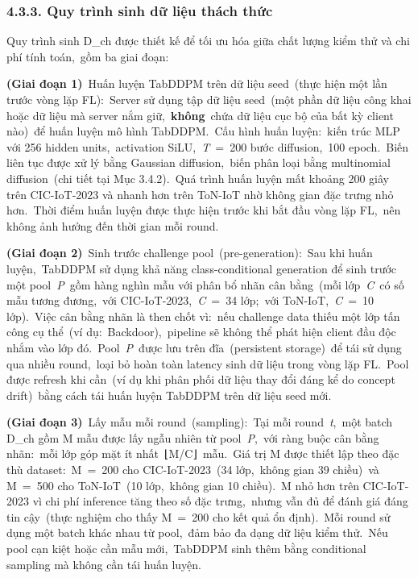 \subsubsection{4.3.3. Quy trình sinh dữ liệu thách thức}\label{quy-truxecnh-sinh-dux1eef-liux1ec7u-thuxe1ch-thux1ee9c}

Quy trình sinh D\_ch được thiết kế để tối ưu hóa giữa chất lượng kiểm thử và chi phí tính toán,~gồm ba giai đoạn:

\textbf{(Giai đoạn 1)}~Huấn luyện TabDDPM trên dữ liệu seed~(thực hiện một lần trước vòng lặp FL):~Server sử dụng tập dữ liệu seed~(một phần dữ liệu công khai hoặc dữ liệu mà server nắm giữ,~\textbf{không}~chứa dữ liệu cục bộ của bất kỳ client nào)~để huấn luyện mô hình TabDDPM.~Cấu hình huấn luyện:~kiến trúc MLP với 256 hidden units,~activation SiLU,~\emph{T}~=~200 bước diffusion,~100 epoch.~Biến liên tục được xử lý bằng Gaussian diffusion,~biến phân loại bằng multinomial diffusion~(chi tiết tại Mục 3.4.2).~Quá trình huấn luyện mất khoảng 200 giây trên CIC-IoT-2023 và nhanh hơn trên ToN-IoT nhờ không gian đặc trưng nhỏ hơn.~Thời điểm huấn luyện được thực hiện trước khi bắt đầu vòng lặp FL,~nên không ảnh hưởng đến thời gian mỗi round.

\textbf{(Giai đoạn 2)}~Sinh trước challenge pool~(pre-generation):~Sau khi huấn luyện,~TabDDPM sử dụng khả năng class-conditional generation để sinh trước một pool~\emph{P}~gồm hàng nghìn mẫu với phân bổ nhãn cân bằng~(mỗi lớp~\emph{C}~có số mẫu tương đương,~với CIC-IoT-2023,~\emph{C}~=~34 lớp;~với ToN-IoT,~\emph{C}~=~10 lớp).~Việc cân bằng nhãn là then chốt vì:~nếu challenge data thiếu một lớp tấn công cụ thể~(ví dụ:~Backdoor),~pipeline sẽ không thể phát hiện client đầu độc nhắm vào lớp đó.~Pool~\emph{P}~được lưu trên đĩa~(persistent storage)~để tái sử dụng qua nhiều round,~loại bỏ hoàn toàn latency sinh dữ liệu trong vòng lặp FL.~Pool được refresh khi cần~(ví dụ khi phân phối dữ liệu thay đổi đáng kể do concept drift)~bằng cách tái huấn luyện TabDDPM trên dữ liệu seed mới.

\textbf{(Giai đoạn 3)}~Lấy mẫu mỗi round~(sampling):~Tại mỗi round~\emph{t},~một batch D\_ch gồm M mẫu được lấy ngẫu nhiên từ pool~\emph{P},~với ràng buộc cân bằng nhãn:~mỗi lớp góp mặt ít nhất~⌊M/C⌋~mẫu.~Giá trị M được thiết lập theo đặc thù dataset:~M~=~200 cho CIC-IoT-2023~(34 lớp,~không gian 39 chiều)~và M~=~500 cho ToN-IoT~(10 lớp,~không gian 10 chiều).~M nhỏ hơn trên CIC-IoT-2023 vì chi phí inference tăng theo số đặc trưng,~nhưng vẫn đủ để đánh giá đáng tin cậy~(thực nghiệm cho thấy M~=~200 cho kết quả ổn định).~Mỗi round sử dụng một batch khác nhau từ pool,~đảm bảo đa dạng dữ liệu kiểm thử.~Nếu pool cạn kiệt hoặc cần mẫu mới,~TabDDPM sinh thêm bằng conditional sampling mà không cần tái huấn luyện.


